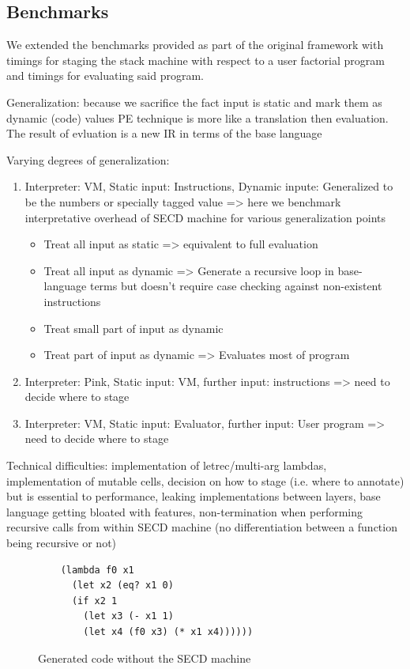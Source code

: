\documentclass{article}
\theoremstyle{definition}
\begin{document}
\subsection{Benchmarks}
We extended the benchmarks provided as part of the original framework \cite{amin2017collapsing} with timings for staging the stack machine with respect to a user factorial program and timings for evaluating said program.

Generalization: because we sacrifice the fact input is static and mark them as dynamic (code) values
PE technique is more like a translation then evaluation. The result of evluation is a new IR in terms of the base language

Varying degrees of generalization:
\begin{enumerate}
	\item Interpreter: VM, Static input: Instructions, Dynamic inpute: Generalized to be the numbers or specially tagged value => here we benchmark interpretative overhead of SECD machine for various generalization points
	\begin{itemize}
		\item Treat all input as static => equivalent to full evaluation
		\item Treat all input as dynamic => Generate a recursive loop in base-language terms but doesn't require case checking against non-existent instructions
		\item Treat small part of input as dynamic
		\item Treat part of input as dynamic => Evaluates most of program
	\end{itemize}
	\item Interpreter: Pink, Static input: VM, further input: instructions => need to decide where to stage
	\item Interpreter: VM, Static input: Evaluator, further input: User program => need to decide where to stage
\end{enumerate}

Technical difficulties: implementation of letrec/multi-arg lambdas, implementation of mutable cells, decision on how to stage (i.e. where to annotate) but is essential to performance, leaking implementations between layers, base language getting bloated with features, non-termination when performing recursive calls from within SECD machine (no differentiation between a function being recursive or not)

\begin{figure}[ht]
\centering
\begin{verbatim}
	(lambda f0 x1
	  (let x2 (eq? x1 0)
	  (if x2 1
		(let x3 (- x1 1)
		(let x4 (f0 x3) (* x1 x4))))))
\end{verbatim}
\caption{Generated code without the SECD machine}
\label{lst:pink_factorial}
\end{figure}
\end{document}
